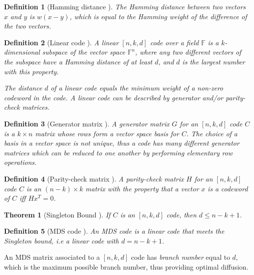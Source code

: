 \documentclass{report}
\newtheorem{definition}{Definition}{\bfseries}{\itshape}
\newtheorem{theorem}{Theorem}{\bfseries}{\itshape}
\begin{document}
\begin{definition}[Hamming distance \cite{SloaneBook}]
The Hamming distance between two vectors $x$ and $y$ is $w(x - y)$, which is equal to the Hamming weight of the difference of the two vectors.
\end{definition}

\begin{definition}[Linear code \cite{SloaneBook}]
A linear $[n, k, d]$ code over a field $\mathbb{F}$ is a $k$-dimensional subspace of the vector space $\mathbb{F}^n$, where any two different vectors of the subspace have a Hamming distance of at least $d$, and $d$ is the largest number with this property.

The distance $d$ of a linear code equals the minimum weight of a non-zero codeword in the code. A linear code can be described by generator and/or parity-check matrices.
\end{definition}

\begin{definition}[Generator matrix \cite{SloaneBook}]
A generator matrix $G$ for an $[n, k, d]$ code $C$ is a $k \times n$ matrix whose rows form a vector space basis for $C$. The choice of a basis in a vector space is not unique, thus a code has many different generator matrices which can be reduced to one another by performing elementary row operations.
\end{definition}

\begin{definition}[Parity-check matrix \cite{SloaneBook}]
A parity-check matrix $H$ for an $[n, k, d]$ code $C$ is an $(n-k) \times k$ matrix with the property that a vector $x$ is a codeword of $C$ iff $Hx^T = 0$.
\end{definition}

\begin{theorem}[Singleton Bound \cite{SloaneBook}]
If $C$ is an $[n, k, d]$ code, then $d \leq n - k + 1$.
\end{theorem}

\begin{definition}[MDS code \cite{SloaneBook}]\label{def:mds-code-singleton}
An \emph{MDS code} is a \emph{linear code} that meets the \emph{Singleton bound}, i.e a linear code with $d = n - k + 1$.
\end{definition}

An MDS matrix associated to a $[n, k, d]$ code has \emph{branch number} equal to $d$, which is the maximum possible branch number, thus providing optimal diffusion.
\end{document}
